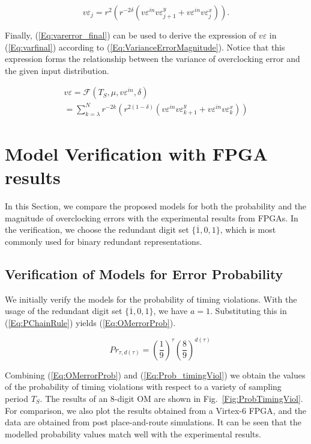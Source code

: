 \documentclass[journal]{IEEEtran}
\begin{document}
\begin{equation}\label{Eq:varerror_final}
v\varepsilon_j=r^2 \left( r^{-2\delta} \left( v\varepsilon^{in}  v\varepsilon^y_{j+1} +v\varepsilon^{in}  v\varepsilon^x_j \right) \right).
\end{equation}

Finally, (\ref{Eq:varerror_final}) can be used to derive the expression of $v\varepsilon$ in (\ref{Eq:varfinal}) according to (\ref{Eq:VarianceErrorMagnitude}). Notice that this expression forms the relationship between the variance of overclocking error and the given input distribution.

\begin{equation}\label{Eq:varfinal}
\begin{array}{l}
v\varepsilon =  \mathcal{F}(T_S, \mu, v\varepsilon^{in}, \delta)\\
=\sum_{k=\lambda}^{N}r^{-2k} \left( r^{2(1-\delta)} \left(v\varepsilon^{in}    v\varepsilon^y_{k+1} +v\varepsilon^{in}   v\varepsilon^x_k\right)\right)
\end{array}
\end{equation}




\section{Model Verification with FPGA results}

In this Section, we compare the proposed models for both the probability and the magnitude of overclocking errors with the experimental results from FPGAs. In the verification, we choose the redundant digit set $\{\overline{1},0,1\}$, which is most commonly used for binary redundant representations. 

\subsection{Verification of Models for Error Probability}
We initially verify the models for the probability of timing violations. With the usage of the redundant digit set $\{\overline{1},0,1\}$, we have $a=1$. Substituting this in (\ref{Eq:PChainRule}) yields (\ref{Eq:OMerrorProb}).

\begin{equation}\label{Eq:OMerrorProb}
 \quad Pr_{\tau,d(\tau )} =\left(\frac{1}{9}\right)^\tau \left(\frac{8}{9}\right)^{d(\tau )} 
\end{equation}

Combining (\ref{Eq:OMerrorProb}) and (\ref{Eq:Prob_timingViol}) we obtain the values of the probability of timing violations with respect to a variety of sampling period $T_S$. The results of an 8-digit OM are shown in Fig.~\ref{Fig:ProbTimingViol}. For comparison, we also plot the results obtained from a Virtex-6 FPGA, and the data are obtained from post place-and-route simulations. It can be seen that the modelled probability values match well with the experimental results.
\end{document}
